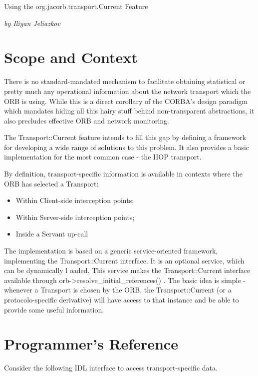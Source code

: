 %
%

Using the org.jacorb.transport.Current Feature

\emph{by Iliyan Jeliazkov}

\section{Scope and Context}

There is no standard-mandated mechanism to facilitate obtaining statistical or pretty 
much any operational information about the network transport which the ORB is using. 
While this is a direct corollary of the CORBA's design paradigm which mandates hiding 
all this hairy stuff behind non-transparent abstractions, it also precludes effective 
ORB and network monitoring. 

The Transport::Current feature intends to fill this gap by defining a framework 
for developing a wide range of solutions to this problem. It also provides a basic 
implementation for the most common case - the IIOP transport. 

By definition, transport-specific information is available in contexts where the 
ORB has selected a Transport:

\begin{itemize}
\item Within Client-side interception points; 
\item Within Server-side interception points; 
\item Inside a Servant up-call 
\end{itemize}

The implementation is based on a generic service-oriented framework, implementing 
the Transport::Current interface. It is an optional service, which can be dynamically l
oaded. This service makes the Transport::Current interface available through 
orb->resolve\_initial\_references() . The basic idea is simple - whenever a Transport 
is chosen by the ORB, the Transport::Current (or a protocolo-specific derivative) 
will have access to that instance and be able to provide some useful information. 



\section{Programmer's Reference}

Consider the following IDL interface to access transport-specific data. 

